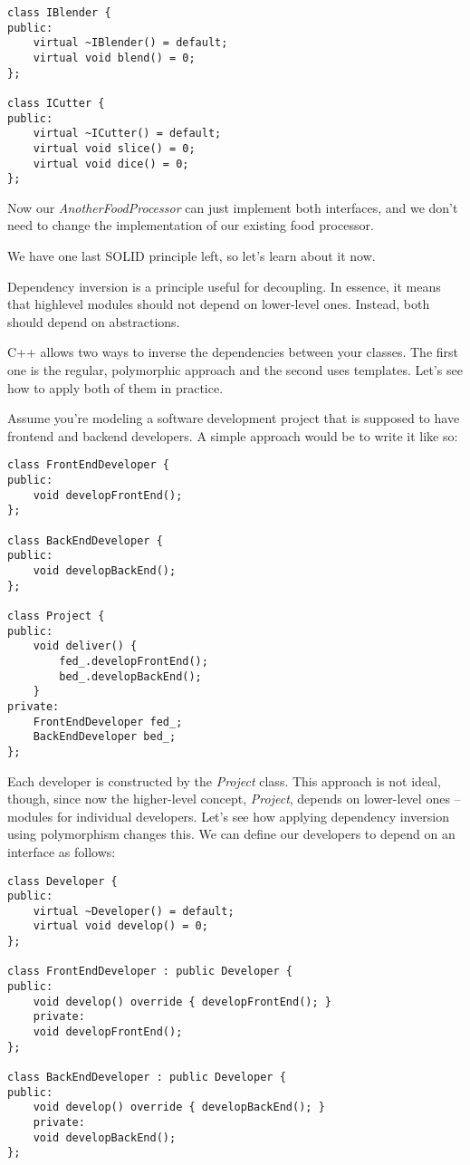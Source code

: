 \begin{lstlisting}[style=styleCXX]
class IBlender {
public:
	virtual ~IBlender() = default;
	virtual void blend() = 0;
};

class ICutter {
public:
	virtual ~ICutter() = default;
	virtual void slice() = 0;
	virtual void dice() = 0;
};
\end{lstlisting}

Now our \textit{AnotherFoodProcessor} can just implement both interfaces, and we don't need to change the implementation of our existing food processor.

We have one last SOLID principle left, so let's learn about it now.



Dependency inversion is a principle useful for decoupling. In essence, it means that highlevel modules should not depend on lower-level ones. Instead, both should depend on abstractions.

C++ allows two ways to inverse the dependencies between your classes. The first one is the regular, polymorphic approach and the second uses templates. Let's see how to apply both of them in practice.

Assume you're modeling a software development project that is supposed to have frontend and backend developers. A simple approach would be to write it like so:


\begin{lstlisting}[style=styleCXX]
class FrontEndDeveloper {
public:
	void developFrontEnd();
};

class BackEndDeveloper {
public:
	void developBackEnd();
};

class Project {
public:
	void deliver() {
		fed_.developFrontEnd();
		bed_.developBackEnd();
	}
private:
	FrontEndDeveloper fed_;
	BackEndDeveloper bed_;
};

\end{lstlisting}

Each developer is constructed by the \textit{Project} class. This approach is not ideal, though, since now the higher-level concept, \textit{Project}, depends on lower-level ones – modules for individual developers. Let's see how applying dependency inversion using polymorphism changes this. We can define our developers to depend on an interface as follows:


\begin{lstlisting}[style=styleCXX]
class Developer {
public:
	virtual ~Developer() = default;
	virtual void develop() = 0;
};

class FrontEndDeveloper : public Developer {
public:
	void develop() override { developFrontEnd(); }
	private:
	void developFrontEnd();
};

class BackEndDeveloper : public Developer {
public:
	void develop() override { developBackEnd(); }
	private:
	void developBackEnd();
};

\end{lstlisting}

